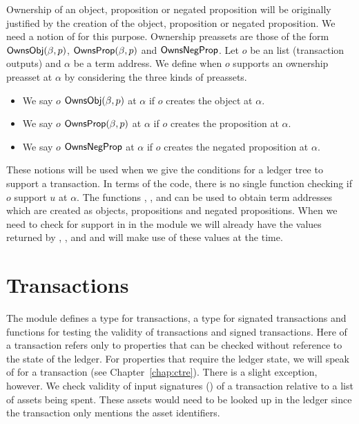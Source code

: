 Ownership of an object, proposition or negated proposition will be originally
justified by the creation of the object, proposition or negated proposition.
We need a notion of {} for this purpose.
Ownership preassets
are those of the form
${\constr{OwnsObj}}(\beta,p)$,
${\constr{OwnsProp}}(\beta,p)$
and
${\constr{OwnsNegProp}}$.
Let $o$ be an {} list (transaction outputs)
and $\alpha$ be a term address.
We define when $o$ supports an ownership preasset at $\alpha$
by considering the three kinds of preassets.
\begin{itemize}
\item We say $o$ {} ${\constr{OwnsObj}}(\beta,p)$ at $\alpha$
      if $o$ creates the object at $\alpha$.
\item We say $o$ {} ${\constr{OwnsProp}}(\beta,p)$ at $\alpha$
      if $o$ creates the proposition at $\alpha$.
\item We say $o$ {} ${\constr{OwnsNegProp}}$ at $\alpha$
      if $o$ creates the negated proposition at $\alpha$.
\end{itemize}

These notions will be used when we give the conditions
for a ledger tree to support a transaction.
In terms of the code, there is no single function checking if $o$ support $u$ at $\alpha$.
The functions
{},
{},
and
{}
can be used to obtain term addresses which are created as objects, propositions
and negated propositions.
When we need to check for support in {}
in the module {}
we will already have the values returned by
{},
{},
and
{}
and will make use of these values at the time.

\section{Transactions}

The module  defines a type {} for transactions,
a type {} for signated transactions
and functions for testing the validity of transactions and signed transactions.
Here {} of a transaction refers only to properties that
can be checked without reference to the state of the ledger.
For properties that require the ledger state, we will speak of {}
for a transaction (see Chapter~\ref{chap:ctre}).
There is a slight exception, however. We check validity of input signatures 
({}) of
a transaction relative to a list of assets being spent.
These assets would need to be looked up in the ledger
since the transaction only mentions the asset identifiers.

